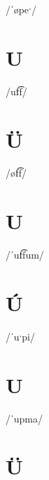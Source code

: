 \documentclass[10pt,a4paper,twoside]{book}
\begin{document}
\begin{multicols}{3}
 {/ˈøpeˑ/} {}
\end{multicols}

\section*{U}

\begin{multicols}{3}
 {/uf͡f/} {}
\end{multicols}

\section*{Ü}

\begin{multicols}{3}
 {/øf͡f/} {}
\end{multicols}

\section*{U}

\begin{multicols}{3}
 {/ˈuf͡fum/} {}
\end{multicols}

\section*{Ú}

\begin{multicols}{3}
 {/ˈuˑpi/} {}
\end{multicols}

\section*{U}

\begin{multicols}{3}
 {/ˈupma/} {}
\end{multicols}

\section*{Ü}
\end{document}
